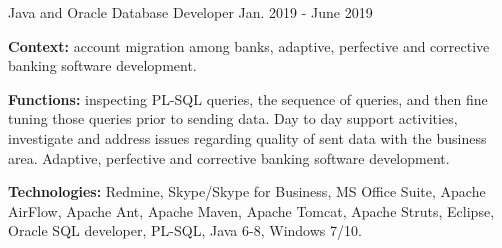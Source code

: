 \begin{cventries}
  \cventry
    {Java and Oracle Database Developer} %
    {} %
    {} %
    {Jan. 2019 - June 2019} %
    {
      \begin{cvitems} %
		\item[] {\textbf{Context:} account migration among banks, adaptive, perfective and corrective banking software development. 
}
		\item[] {\textbf{Functions:} inspecting PL-SQL queries, the sequence of queries, and then fine tuning those queries prior to sending data. Day to day support activities, investigate and address issues regarding quality of sent data with the business area. Adaptive, perfective and corrective banking software development.}		
		\item[] {\textbf{Technologies:} \textcolor{rainbowcolor-olive}{Redmine}, \textcolor{rainbowcolor-olive}{Skype/Skype for Business}, \textcolor{rainbowcolor-olive}{MS Office Suite}, \textcolor{rainbowcolor-olive}{Apache AirFlow}, \textcolor{rainbowcolor-olive}{Apache Ant}, \textcolor{rainbowcolor-olive}{Apache Maven}, \textcolor{rainbowcolor-olive}{Apache Tomcat}, \textcolor{rainbowcolor-olive}{Apache Struts}, \textcolor{rainbowcolor-olive}{Eclipse}, \textcolor{rainbowcolor-olive}{Oracle SQL developer}, \textcolor{rainbowcolor-indigo}{PL-SQL}, \textcolor{rainbowcolor-indigo}{Java 6-8}, \textcolor{rainbowcolor-orange}{Windows 7/10}.}		
      \end{cvitems}
    } 
    

\end{cventries}
